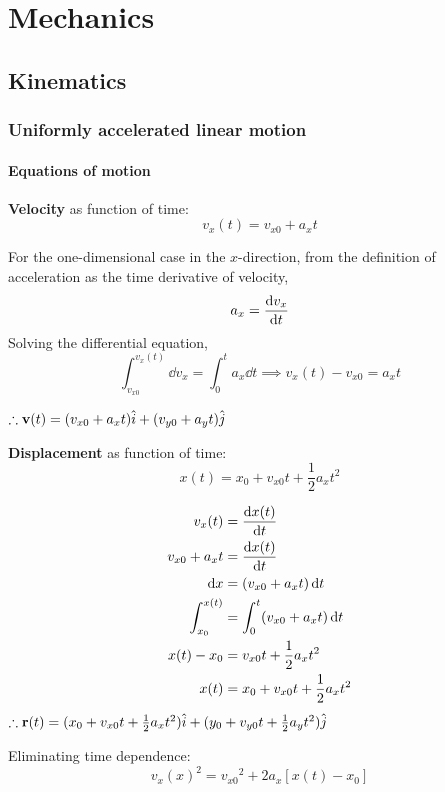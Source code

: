 \part{Mechanics}
\chapter{Kinematics}
\section{Uniformly accelerated linear motion}
\subsection{Equations of motion}
\textbf{Velocity} as function of time:
\begin{equation}
v_x(t) = v_{x0} + a_xt
\end{equation}

\begin{derivation}
For the one-dimensional case in the $x$-direction, from the definition of acceleration as the time derivative of velocity,
\[ a_x = \dv{v_x}{t} \]
Solving the differential equation,
\[ \int_{v_{x0}}^{v_x(t)} \dd{v_x} = \int_{0}^{t} a_x \dd{t} \implies v_x(t)-v_{x0} = a_xt \]

$\therefore \vb{v}(t)=(v_{x0}+a_xt)\hat{i}+(v_{y0}+a_yt)\hat{j}$
\end{derivation}

\textbf{Displacement} as function of time:
\begin{equation}
x(t)=x_0+v_{x0}t+\frac{1}{2}a_xt^2
\end{equation}

\begin{derivation}
\begin{align*}
v_x(t) &= \odv{x(t)}{t} \\
v_{x0}+a_xt &= \odv{x(t)}{t} \\
\dd{x} &= (v_{x0}+a_xt) \dd{t} \\
\int_{x_0}^{x(t)} &= \int_0^t (v_{x0}+a_xt) \dd{t} \\
x(t)-x_0 &= v_{x0}t+\frac{1}{2}a_xt^2 \\
x(t) &= x_0+v_{x0}t+\frac{1}{2}a_xt^2
\end{align*}
$\therefore \vb{r}(t)=(x_0+v_{x0}t+\frac{1}{2}a_xt^2)\hat{i}+(y_0+v_{y0}t+\frac{1}{2}a_yt^2)\hat{j}$
\end{derivation}

Eliminating time dependence:
\begin{equation}
v_x(x)^2 = {v_{x0}}^2+2a_x[x(t)-x_0]
\end{equation}

